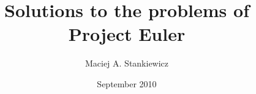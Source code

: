 \documentclass[12pt, a4paper]{article}
\begin{document}
\title{Solutions to the problems of Project Euler}
\author{Maciej A. Stankiewicz}
\date{September 2010}
\maketitle
\thispagestyle{empty}
\newpage


%
%
%
%
%
%
%
%
%



\end{document}
